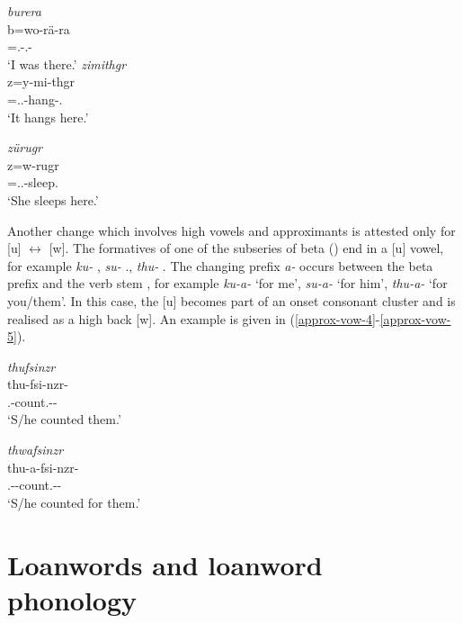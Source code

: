 \begin{exe}
	\ex \emph{burera}\\
	\gll b=wo-rä-ra\\
	\Med{}=\Fsg.\Alph-\Cop.\Ndu{}-\Pst{}\\
	\trans `I was there.'
	\label{approx-vow-2}
	\vspace{.7cm}
	\ex \emph{zimithgr}\\
	\gll z=y-mi-thgr\\
	\Prox{}=\Tsg.\Masc.\Alph-hang-\Stat.\Ndu{}\\
	\trans `It hangs here.'
	\label{approx-vow-3}

	\ex \emph{zürugr}\\
	\gll z=w-rugr\\
	\Prox{}=\Tsg.\F.\Alph-sleep.\Ndu{}\\
	\trans `She sleeps here.'
	\label{approx-vow-1}
\end{exe}

Another change which involves high vowels and approximants is attested only for [u] $\leftrightarrow$ [w]. The formatives of one of the subseries of beta (\Betatwo) end in a [u] vowel, for example \emph{ku-} \Fsg{}, \emph{su-} \Tsg.\Masc{}, \emph{thu-} \Stnsg{}. The  changing prefix \emph{a-} occurs between the beta prefix and the verb stem , for example \emph{ku-a-} `for me', \emph{su-a-} `for him', \emph{thu-a-} `for you/them'. In this case, the [u] becomes part of an onset consonant cluster and is realised as a high back  [w]. An example is given in (\ref{approx-vow-4}-\ref{approx-vow-5}).

\begin{exe}
	\ex \emph{thufsinzr}\\
	\gll thu-fsi-nzr-\Zero{}\\
	\Stnsg{}.\Betatwo{}-count.\Ext{}-\Ndu{}-\Stsg{}\\
	\trans `S/he counted them.'
	\label{approx-vow-4}

	\ex \emph{thwafsinzr}\\
	\gll thu-a-fsi-nzr-\Zero{}\\
	\Stnsg{}.\Betatwo{}-\Vc{}-count.\Ext{}-\Ndu{}-\Stsg{}\\
	\trans `S/he counted for them.'
	\label{approx-vow-5}
\end{exe}

\section{Loanwords and loanword phonology} \label{loanword-phonology}

